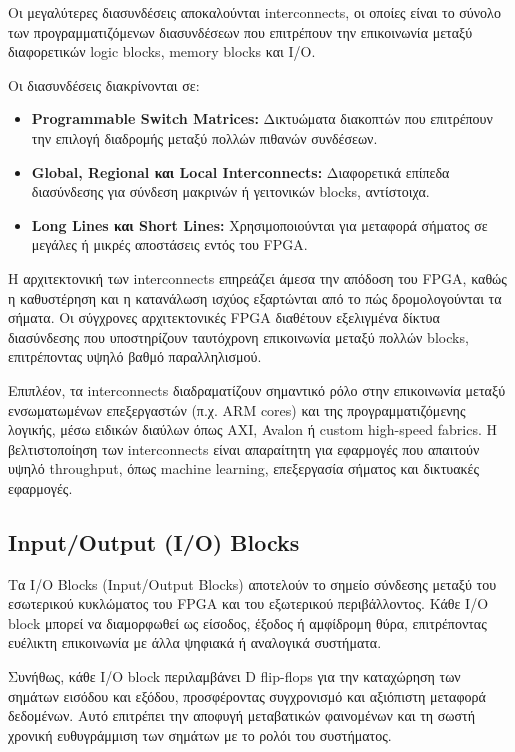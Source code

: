 Οι μεγαλύτερες διασυνδέσεις αποκαλούνται interconnects, οι οποίες είναι το σύνολο των προγραμματιζόμενων διασυνδέσεων που επιτρέπουν την επικοινωνία μεταξύ διαφορετικών logic blocks, memory blocks και I/O.

Οι διασυνδέσεις διακρίνονται σε:
\begin{itemize}
  \item \textbf{Programmable Switch Matrices:} Δικτυώματα διακοπτών που επιτρέπουν την επιλογή διαδρομής μεταξύ πολλών πιθανών συνδέσεων.
  \item \textbf{Global, Regional και Local Interconnects:} Διαφορετικά επίπεδα διασύνδεσης για σύνδεση μακρινών ή γειτονικών blocks, αντίστοιχα.
  \item \textbf{Long Lines και Short Lines:} Χρησιμοποιούνται για μεταφορά σήματος σε μεγάλες ή μικρές αποστάσεις εντός του FPGA.
\end{itemize}

Η αρχιτεκτονική των interconnects επηρεάζει άμεσα την απόδοση του FPGA, καθώς η καθυστέρηση και η κατανάλωση ισχύος εξαρτώνται από το πώς δρομολογούνται τα σήματα. Οι σύγχρονες αρχιτεκτονικές FPGA διαθέτουν εξελιγμένα δίκτυα διασύνδεσης που υποστηρίζουν ταυτόχρονη επικοινωνία μεταξύ πολλών blocks, επιτρέποντας υψηλό βαθμό παραλληλισμού.

Επιπλέον, τα interconnects διαδραματίζουν σημαντικό ρόλο στην επικοινωνία μεταξύ ενσωματωμένων επεξεργαστών (π.χ. ARM cores) και της προγραμματιζόμενης λογικής, μέσω ειδικών διαύλων όπως AXI, Avalon ή custom high-speed fabrics. Η βελτιστοποίηση των interconnects είναι απαραίτητη για εφαρμογές που απαιτούν υψηλό throughput, όπως machine learning, επεξεργασία σήματος και δικτυακές εφαρμογές.

\subsection{Input/Output (I/O) Blocks}

Τα I/O Blocks (Input/Output Blocks) αποτελούν το σημείο σύνδεσης μεταξύ του εσωτερικού κυκλώματος του FPGA και του εξωτερικού περιβάλλοντος. Κάθε I/O block μπορεί να διαμορφωθεί ως είσοδος, έξοδος ή αμφίδρομη θύρα, επιτρέποντας ευέλικτη επικοινωνία με άλλα ψηφιακά ή αναλογικά συστήματα.

Συνήθως, κάθε I/O block περιλαμβάνει D flip-flops για την καταχώρηση των σημάτων εισόδου και εξόδου, προσφέροντας συγχρονισμό και αξιόπιστη μεταφορά δεδομένων. Αυτό επιτρέπει την αποφυγή μεταβατικών φαινομένων και τη σωστή χρονική ευθυγράμμιση των σημάτων με το ρολόι του συστήματος.

